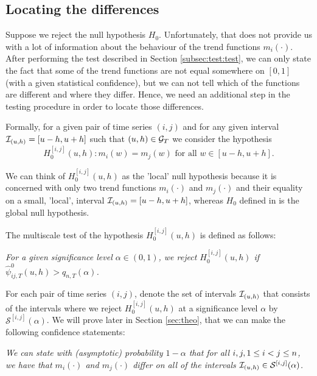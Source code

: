 \documentclass[a4paper,12pt]{article}
\makeatletter
\renewcommand{\eqref}[1]{\tagform@{\ref{#1}}}
\makeatother
\begin{document}
\subsection{Locating the differences}\label{subsec:test:loc}

Suppose we reject the null hypothesis $H_0$. Unfortunately, that does not provide us with a lot of information about the behaviour of the trend functions $m_i(\cdot)$. After performing the test described in Section \ref{subsec:test:test}, we can only state the fact that some of the trend functions are not equal somewhere on $[0, 1]$ (with a given statistical confidence), but we can not tell which of the functions are different and where they differ. Hence, we need an additional step in the testing procedure in order to locate those differences.

Formally, for a given pair of time series $(i, j)$ and for any given interval \linebreak $\mathcal{I}_{(u, h)} = [u-h, u+h]$ such that $(u, h) \in \mathcal{G}_T$ we consider the hypothesis 
\[ H_0^{[i,j]}(u,h): m_i(w) = m_j(w) \text{ for all } w \in [u-h,u+h]. \] 

We can think of $H_0^{[i,j]}(u,h)$ as the 'local' null hypothesis because it is concerned with only two trend functions $m_i(\cdot)$ and $m_j(\cdot)$ and their equality on a small, 'local', interval $\mathcal{I}_{(u, h)} = [u-h, u+h]$, whereas $H_0$ defined in \eqref{eq:null} is the global null hypothesis.

The multiscale test of the hypothesis $H_0^{[i,j]}(u,h)$ is defined as follows: 
\begin{center}
\begin{minipage}[c][1.25cm][c]{13cm}
\textit{For a given significance level $\alpha \in (0,1)$, we reject $H_0^{[i,j]}(u,h)$ if $\hat{\psi}^0_{ij,T}(u, h) > q_{n,T}(\alpha)$.}
\end{minipage}
\end{center}

For each pair of time series $(i, j)$, denote the set of intervals $\mathcal{I}_{(u, h)}$ that consists of the intervals where we reject $H_0^{[i,j]}(u,h)$ at a significance level $\alpha$ by $\mathcal{S}^{[i, j]}(\alpha)$. We will prove later in Section \ref{sec:theo}, that we can make the following confidence statements:

\begin{center}
\begin{minipage}[c][1.25cm][c]{13cm}
\textit{We can state with (asymptotic) probability $1-\alpha$ that for all $i, j, \linebreak1\leq i < j \leq n$, we have that $m_i(\cdot)$ and $m_j(\cdot)$ differ on all of the intervals $\mathcal{I}_{(u, h)} \in \mathcal{S}^{[i, j]}(\alpha)$.}
\end{minipage}
\end{center}
\end{document}
